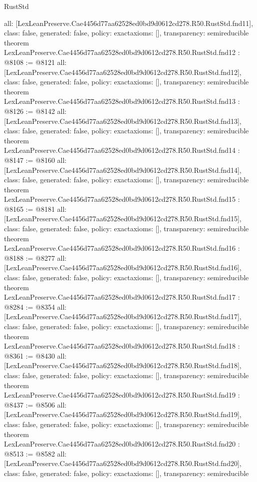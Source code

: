 \begin{lexlean}{RustStd}
\begin{coremodule}
{  all: [LexLeanPreserve.Cae4456d77aa62528ed0bd9d0612cd278.R50.RustStd.fnd11],
  class: false,
  generated: false,
  policy: exact{axioms: []},
  transparency: semireducible
}
theorem LexLeanPreserve.Cae4456d77aa62528ed0bd9d0612cd278.R50.RustStd.fnd12 : @8108 := @8121 {
  all: [LexLeanPreserve.Cae4456d77aa62528ed0bd9d0612cd278.R50.RustStd.fnd12],
  class: false,
  generated: false,
  policy: exact{axioms: []},
  transparency: semireducible
}
theorem LexLeanPreserve.Cae4456d77aa62528ed0bd9d0612cd278.R50.RustStd.fnd13 : @8126 := @8142 {
  all: [LexLeanPreserve.Cae4456d77aa62528ed0bd9d0612cd278.R50.RustStd.fnd13],
  class: false,
  generated: false,
  policy: exact{axioms: []},
  transparency: semireducible
}
theorem LexLeanPreserve.Cae4456d77aa62528ed0bd9d0612cd278.R50.RustStd.fnd14 : @8147 := @8160 {
  all: [LexLeanPreserve.Cae4456d77aa62528ed0bd9d0612cd278.R50.RustStd.fnd14],
  class: false,
  generated: false,
  policy: exact{axioms: []},
  transparency: semireducible
}
theorem LexLeanPreserve.Cae4456d77aa62528ed0bd9d0612cd278.R50.RustStd.fnd15 : @8165 := @8181 {
  all: [LexLeanPreserve.Cae4456d77aa62528ed0bd9d0612cd278.R50.RustStd.fnd15],
  class: false,
  generated: false,
  policy: exact{axioms: []},
  transparency: semireducible
}
theorem LexLeanPreserve.Cae4456d77aa62528ed0bd9d0612cd278.R50.RustStd.fnd16 : @8188 := @8277 {
  all: [LexLeanPreserve.Cae4456d77aa62528ed0bd9d0612cd278.R50.RustStd.fnd16],
  class: false,
  generated: false,
  policy: exact{axioms: []},
  transparency: semireducible
}
theorem LexLeanPreserve.Cae4456d77aa62528ed0bd9d0612cd278.R50.RustStd.fnd17 : @8284 := @8354 {
  all: [LexLeanPreserve.Cae4456d77aa62528ed0bd9d0612cd278.R50.RustStd.fnd17],
  class: false,
  generated: false,
  policy: exact{axioms: []},
  transparency: semireducible
}
theorem LexLeanPreserve.Cae4456d77aa62528ed0bd9d0612cd278.R50.RustStd.fnd18 : @8361 := @8430 {
  all: [LexLeanPreserve.Cae4456d77aa62528ed0bd9d0612cd278.R50.RustStd.fnd18],
  class: false,
  generated: false,
  policy: exact{axioms: []},
  transparency: semireducible
}
theorem LexLeanPreserve.Cae4456d77aa62528ed0bd9d0612cd278.R50.RustStd.fnd19 : @8437 := @8506 {
  all: [LexLeanPreserve.Cae4456d77aa62528ed0bd9d0612cd278.R50.RustStd.fnd19],
  class: false,
  generated: false,
  policy: exact{axioms: []},
  transparency: semireducible
}
theorem LexLeanPreserve.Cae4456d77aa62528ed0bd9d0612cd278.R50.RustStd.fnd20 : @8513 := @8582 {
  all: [LexLeanPreserve.Cae4456d77aa62528ed0bd9d0612cd278.R50.RustStd.fnd20],
  class: false,
  generated: false,
  policy: exact{axioms: []},
  transparency: semireducible
}
\end{coremodule}
\end{lexlean}
